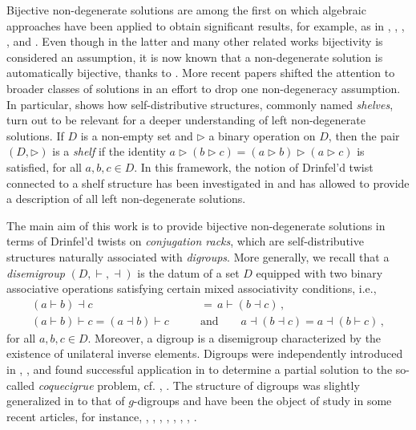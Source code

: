 \documentclass[preprint,1p]{elsarticle}
\numberwithin{equation}{section}
\theoremstyle{definition}               %
\newcommand{\vd}{\vdash}
\newcommand{\dv}{\dashv}
\begin{document}
Bijective non-degenerate solutions are among the first on which algebraic approaches have been applied to obtain significant results, for example, as in \cite{ESS99}, \cite{GaMa08}, \cite{GaVa98}, \cite{LuYZ00}, and \cite{So00}. 
{Even though in the latter and many other related works bijectivity is considered an assumption, it is now known that a non-degenerate solution is automatically bijective, thanks to \cite{JePi25}.}
More recent papers shifted the attention to broader classes of solutions in an effort to drop one non-degeneracy assumption. In particular, \cite{Le18} shows how self-distributive structures, commonly named \emph{shelves}, turn out to be relevant for a deeper understanding of left non-degenerate solutions. If $D$ is a non-empty set and $\triangleright$ a binary operation on $D$, then the pair $\left(D,\triangleright\right)$ is a \emph{shelf} if the identity
$a\triangleright\left(b\triangleright c\right) = \left(a\triangleright b\right)\triangleright\left(a\triangleright c\right)$ is satisfied, for all $a,b,c\in D$.
In this framework, the notion of Drinfel'd twist connected to a shelf structure has been investigated in \cite{DoRySte24} and has allowed to provide a description of all left non-degenerate solutions.

The main aim of this work is to provide bijective non-degenerate solutions in terms of Drinfel'd twists on \emph{conjugation racks}, which are self-distributive structures naturally associated with \emph{digroups}.
More generally, we recall that a \emph{disemigroup} ${(D,\vd,\dv)}$ is the datum of a set $D$ equipped with two binary associative operations satisfying certain mixed associativity conditions, i.e.,
\begin{align*}
    (a \vd b) \dv c \,&=\, a \vd (b \dv c)\,,\\[0.3cm]
    (a \vd b) \vd c = (a \dv b) \vd c \qquad&\text{and}\qquad
    a \dv (b \dv c) = a \dv (b \vd c) \,, 
\end{align*}
for all $a,b,c \in D$.
Moreover, a digroup is a disemigroup characterized by the existence of unilateral inverse elements.
Digroups were independently introduced in \cite{Fel04}, \cite{Liu03}, and found successful application in \cite{Kin07} to determine a partial solution to the so-called \emph{coquecigrue} problem, cf. \cite{Lod92}, \cite{Lod01}.
The structure of digroups was slightly generalized in \cite{Diaz16} to that of $g$-digroups and have been the object of study in some recent articles, for instance, \cite{Ong20}, \cite{Marin-Gaviria25}, \cite{Diaz19}, \cite{Rodriguez23}, \cite{Diaz21}, \cite{Rodriguez21}, \cite{Smith22}, \cite{ZuPiZu24}.
\end{document}
